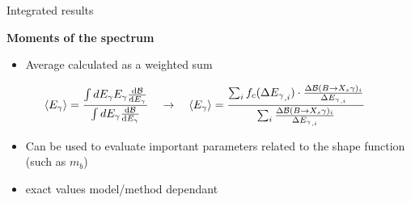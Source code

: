 \documentclass[xcolor=dvipsnames]{beamer}
\begin{document}
\begin{frame}{Integrated results}
\scriptsize
      \vspace{10pt}
      
      {\small\textbf{Moments of the spectrum}}

      \begin{itemize}
         \item Average calculated as a weighted sum
      \end{itemize}

      \vspace{-10pt}

      \begin{align*}\label{eq:weighted_sum_moments}
         \expval{\Egamma} = \frac{\int d\Egamma \Egamma \dv{\mathcal{B}}{\Egamma}}{\int d\Egamma \dv{\mathcal{B}}{\Egamma}}
         \quad \ra \quad 
         \begin{split}
             \expval{\Egamma} &= \frac{\sum_i f_c(\Delta\Egamma^{}_{,i})\cdot  
                                    \frac{\Delta\mathcal{B}(\BtoXsgamma)_i}
                                         {\Delta {\Egamma}_{,i}}}
                                  {\sum_i \frac{\Delta\mathcal{B}(\BtoXsgamma)_i}{\Delta {\Egamma}_{,i}}}
         \end{split}
      \end{align*} 
      

      \vspace{10pt}

      \begin{itemize}
         \item Can be used to evaluate important parameters related to the shape function (such as $m_b$)
         \item[\ra] exact values model/method dependant 
      \end{itemize}
      
\end{frame}
      
\end{document}

